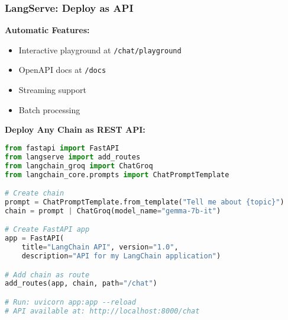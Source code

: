 \begin{frame}[fragile]\frametitle{LangServe: Deploy as API}
\textbf{Automatic Features:}
\begin{itemize}
\item Interactive playground at \texttt{/chat/playground}
\item OpenAPI docs at \texttt{/docs}
\item Streaming support
\item Batch processing
\end{itemize}

\textbf{Deploy Any Chain as REST API:}
\begin{lstlisting}[language=python, basicstyle=\tiny]
from fastapi import FastAPI
from langserve import add_routes
from langchain_groq import ChatGroq
from langchain_core.prompts import ChatPromptTemplate

# Create chain
prompt = ChatPromptTemplate.from_template("Tell me about {topic}")
chain = prompt | ChatGroq(model_name="gemma-7b-it")

# Create FastAPI app
app = FastAPI(
    title="LangChain API", version="1.0",
    description="API for my LangChain application")

# Add chain as route
add_routes(app, chain, path="/chat")

# Run: uvicorn app:app --reload
# API available at: http://localhost:8000/chat
\end{lstlisting}

\end{frame}

